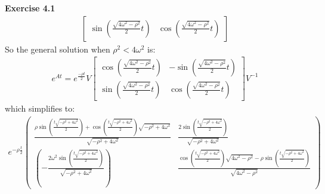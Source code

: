 \documentclass[12pt]{article}
\newenvironment{exercise}[1]{\vspace{.1in}\noindent\textbf{Exercise #1 \hspace{.05em}}}{}
\theoremstyle{definition}
\theoremstyle{remark}
\begin{document}
\begin{exercise}{4.1}
\begin{align}
\begin{bmatrix}
			\sin(\frac{\sqrt{4\omega^2-\rho^2}}{2} t) & \cos(\frac{\sqrt{4\omega^2-\rho^2}}{2} t)
		\end{bmatrix}
	\end{align}
	So the general solution when $\rho^2<4\omega^2$ is:
	\begin{align}
		e^{At}=e^{\frac{-\rho t}{2}}V\begin{bmatrix}
			                             \cos(\frac{\sqrt{4\omega^2-\rho^2}}{2} t) & -\sin(\frac{\sqrt{4\omega^2-\rho^2}}{2} t) \\
			                             \sin(\frac{\sqrt{4\omega^2-\rho^2}}{2} t) & \cos(\frac{\sqrt{4\omega^2-\rho^2}}{2} t)
		                             \end{bmatrix}V^{-1}
	\end{align}
	which simplifies to:
	\begin{align}
		e^{-\rho \frac{t}{2}}\begin{pmatrix}\frac{\rho\sin \left(\frac{t\sqrt{-\rho^2+4\omega^2}}{2}\right)+\cos \left(\frac{t\sqrt{-\rho^2+4\omega^2}}{2}\right)\sqrt{-\rho^2+4\omega^2}}{\sqrt{-\rho^2+4\omega^2}} & \frac{2\sin \left(\frac{t\sqrt{-\rho^2+4\omega^2}}{2}\right)}{\sqrt{-\rho^2+4\omega^2}}                                                                                \\
               \left(-\frac{2\omega^2\sin \left(\frac{t\sqrt{-\rho^2+4\omega^2}}{2}\right)}{\sqrt{-\rho^2+4\omega^2}}\right)                                                            & \frac{\cos \left(\frac{t\sqrt{-\rho^2+4\omega^2}}{2}\right)\sqrt{4\omega^2-\rho^2}-\rho\sin \left(\frac{t\sqrt{-\rho^2+4\omega^2}}{2}\right)}{\sqrt{4\omega^2-\rho^2}}\end{pmatrix}
	\end{align}


\end{exercise}
\end{document}
